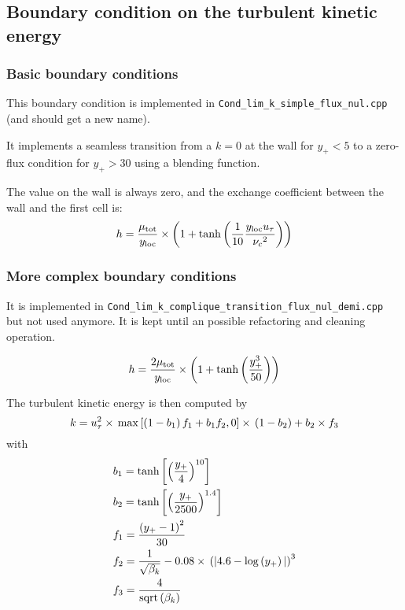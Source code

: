 \subsection{Boundary condition on the turbulent kinetic energy}

\subsubsection{Basic boundary conditions}

This boundary condition is implemented in \texttt{Cond\_lim\_k\_simple\_flux\_nul.cpp} (and should get a new name).

It implements a seamless transition from a $k=0$ at the wall for $y_+<5$ to a zero-flux condition for $y_+>30$ using a blending function.

The value on the wall is always zero, and the exchange coefficient between the wall and the first cell is:
\begin{equation}
    h = \frac{\mu_\text{tot}}{y_\text{loc}} \times \left( 1 + \text{tanh}\left( \frac{1}{10}\frac{y_\text{loc}u_{\tau}}{{{\nu_c}}^2} \right) \right)
    \label{eq_k_blending}
\end{equation}

\subsubsection{More complex boundary conditions}
It is implemented in \texttt{Cond\_lim\_k\_complique\_transition\_flux\_nul\_demi.cpp} but not used anymore. It is kept until an possible refactoring and cleaning operation.

\begin{equation}
    h = \frac{2\mu_\text{tot}}{y_\text{loc}} \times \left( 1 + \text{tanh}\left( \frac{y_+^3}{50} \right) \right)
\end{equation}

The turbulent kinetic energy is then computed by
\begin{equation}
    k = u_{\tau}^2\times{}\max\left[ \left( 1-b_1 \right) f_1 + b_1f_2, 0 \right] \times{} \left( 1 - b_2 \right) + b_2\times{}f_3 
\end{equation}
with
\begin{align}
    &b_1 = \text{tanh}\left[ \left( \frac{y_+}{4} \right)^{10} \right]\\
    &b_2 = \text{tanh}\left[ \left( \frac{y_+}{2500} \right)^{1.4} \right]\\
    &f_1 = \frac{\left( y_+ - 1 \right)^2}{30}\\
    &f_2 = \frac{1}{\sqrt{\beta_k}} - 0.08\times{}\left( \vert 4.6-\log\left( y_+ \right) \vert \right)^3\\
    &f_3 = \frac{4}{\text{sqrt}\left( \beta_k \right)}
\end{align}

